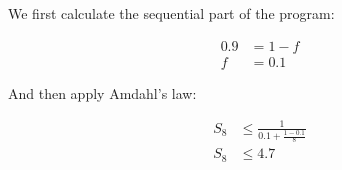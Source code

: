 We first calculate the sequential part of the program:

\begin{equation*}
    \begin{split}
        0.9 & = 1 - f\\
        f & = 0.1
    \end{split}
\end{equation*}

And then apply Amdahl's law:

\begin{equation*}
    \begin{split}
        S_8 & \le \frac{1}{0.1 + \frac{1-0.1}{8}}\\
        S_8 & \le 4.7
    \end{split}
\end{equation*}
